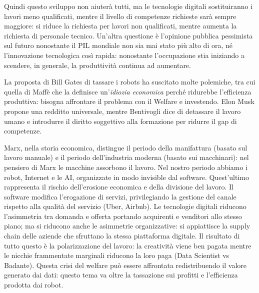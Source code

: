 \documentclass[a4page, 11pt]{article}
\begin{document}

Quindi questo sviluppo non aiuterà tutti, ma le tecnologie digitali sostituiranno i lavori meno qualificati, mentre il livello di competenze richieste sarà sempre maggiore: si riduce la richiesta per lavori non qualificati, mentre aumenta la richiesta di personale tecnico.
Un'altra questione è l'opinione pubblica pessimista sul futuro nonostante il PIL mondiale non sia mai stato più alto di ora, né l'innovazione tecnologica così rapida: nonostante l'occupazione stia iniziando a scendere, in generale, la produttività continua ad aumentare.

La proposta di Bill Gates di tassare i robots ha suscitato molte polemiche, tra cui quella di Maffè che la definisce un'\textit{idiozia economica} perché ridurebbe l'efficienza produttiva: bisogna affrontare il problema con il Welfare e investendo.
Elon Musk propone una redditto universale, mentre Bentivogli dice di detassare il lavoro umano e introdurre il diritto soggettivo alla formazione per ridurre il gap di competenze.

Marx, nella storia economica, distingue il periodo della manifattura (basato sul lavoro manuale) e il periodo dell'industria moderna (basato sui macchinari): nel pensiero di Marx le macchine assorbono il lavoro.
Nel nostro periodo abbiamo i robot, Internet e le AI, organizzate in modo invisible dal software.
Quest'ultimo rappresenta il rischio dell'erosione economica e della divisione del lavoro.
Il software modifica l'erogazione di servizi, privilegiando la gestione del canale rispetto alla qualità del servizio (Uber, Airbnb).
Le tecnologie digitali riducono l'asimmetria tra domanda e offerta portando acquirenti e venditori allo stesso piano; ma si riducono anche le asimmetrie organizzative: si appiattisce la supply chain delle aziende che sfruttano la stessa piattaforma digitale.
Il risultato di tutto questo è la polarizzazione del lavoro: la creatività viene ben pagata mentre le nicchie frammentate marginali riducono la loro paga (Data Scientist vs Badante).
Questa crisi del welfare può essere affrontata redistribuendo il valore generato dai dati: questo tema va oltre la tassazione sui profitti e l'efficienza prodotta dai robot.
\end{document}
